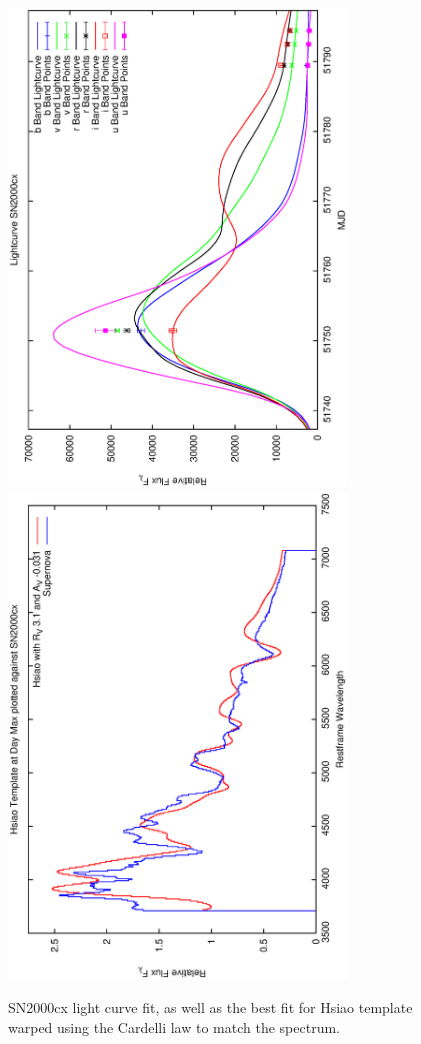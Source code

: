 \clearpage

\begin{figure}[p]
\centering
\includegraphics[angle=-90,width=0.8\textwidth]{./figures/ltcv/SN2000cx_v024_lightcurve.ps}
\hfill
\includegraphics[angle=-90,width=0.8\textwidth]{./figures/hsiao/SN2000cx_v001_hsiao.ps}
\hfill
\caption{SN2000cx light curve fit, as well as the best fit for Hsiao template warped using the Cardelli law to match the spectrum.}
\label{fig:SN2000cxfour2}
\end{figure}

